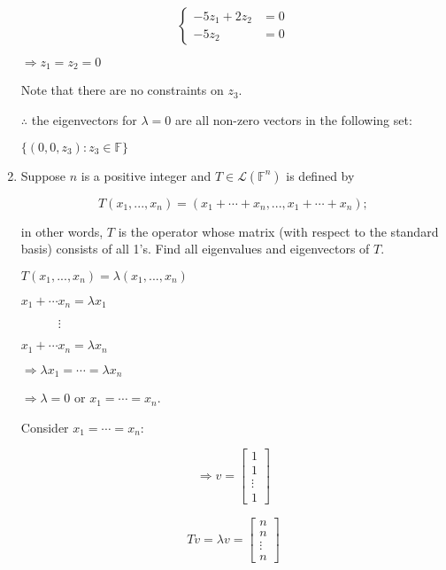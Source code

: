 \documentclass[fleqn]{article}
\makeatletter
\newenvironment{equationCenter}{\@fleqnfalse\begin{equation*}}{\end{equation*}}
\makeatother
\begin{document}
\begin{enumerate}[nolistsep]
		\begin{equation*}
			\left\{
			\begin{aligned}
				-5z_1 + 2z_2 &= 0 \\
				-5z_2 &= 0
			\end{aligned} \right.
		\end{equation*}
		
		$\Rightarrow z_1 = z_2 = 0$
		
		Note that there are no constraints on $z_3$.
		
		$\therefore$ the eigenvectors for $\lambda = 0$ are all non-zero vectors in the following set:
		
		$\{(0, 0, z_3) : z_3 \in \mathbb{F}\}$
		
		\item Suppose $n$ is a positive integer and $T \in \mathcal{L}(\mathbb{F}^n)$ is defined by
		
			\begin{equationCenter}
				T(x_1,...,x_n) = (x_1 + \cdots + x_n,..., x_1 + \cdots + x_n);
			\end{equationCenter}
			
			in other words, $T$ is the operator whose matrix (with respect to the standard basis) consists of all 1's. Find all eigenvalues and eigenvectors of $T$.
			
			$T(x_1,...,x_n) = \lambda(x_1,...,x_n)$
			
			$x_1 + \cdots x_n = {\lambda}x_1$
			
			$\qquad\quad\vdots$
			
			$x_1 + \cdots x_n = {\lambda}x_n$
			
			$\Rightarrow {\lambda}x_1 = \cdots = {\lambda}x_n$
			
			$\Rightarrow \lambda = 0$ or $x_1 = \cdots = x_n$.
			
			Consider $x_1 = \cdots = x_n$:
			
			\begin{equation*}
				\Rightarrow v = \begin{bmatrix}
					1 	   \\
					1      \\
					\vdots \\
					1      
				\end{bmatrix}
			\end{equation*}
			
			\begin{equation*}
				Tv = {\lambda}v = \begin{bmatrix}
					n 	   \\
					n      \\
					\vdots \\
					n      
				\end{bmatrix}
			\end{equation*}
			

\end{enumerate}
\end{document}
